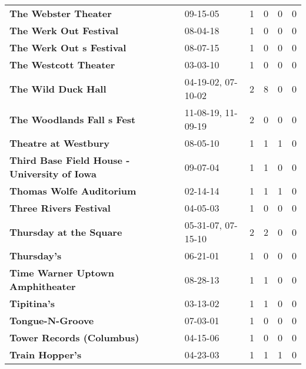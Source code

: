 \begin{supertabular}{p{0.4\textwidth}p{0.3\textwidth}p{0.05\textwidth}p{0.05\textwidth}p{0.05\textwidth}p{0.05\textwidth}}
                                         \textbf{The Webster Theater} &            09-15-05 &  1 &  0 &  0 &  0 \\
                                       \textbf{The Werk Out Festival} &            08-04-18 &  1 &  0 &  0 &  0 \\
                                     \textbf{The Werk Out s Festival} &            08-07-15 &  1 &  0 &  0 &  0 \\
                                        \textbf{The Westcott Theater} &            03-03-10 &  1 &  0 &  0 &  0 \\
                                          \textbf{The Wild Duck Hall} &  04-19-02, 07-10-02 &  2 &  8 &  0 &  0 \\
                                   \textbf{The Woodlands Fall s Fest} &  11-08-19, 11-09-19 &  2 &  0 &  0 &  0 \\
                                         \textbf{Theatre at Westbury} &            08-05-10 &  1 &  1 &  1 &  0 \\
                 \textbf{Third Base Field House - University of Iowa} &            09-07-04 &  1 &  1 &  0 &  0 \\
                                     \textbf{Thomas Wolfe Auditorium} &            02-14-14 &  1 &  1 &  1 &  0 \\
                                       \textbf{Three Rivers Festival} &            04-05-03 &  1 &  0 &  0 &  0 \\
                                      \textbf{Thursday at the Square} &  05-31-07, 07-15-10 &  2 &  2 &  0 &  0 \\
                                                  \textbf{Thursday's} &            06-21-01 &  1 &  0 &  0 &  0 \\
                             \textbf{Time Warner Uptown Amphitheater} &            08-28-13 &  1 &  1 &  0 &  0 \\
                                                  \textbf{Tipitina's} &            03-13-02 &  1 &  1 &  0 &  0 \\
                                             \textbf{Tongue-N-Groove} &            07-03-01 &  1 &  0 &  0 &  0 \\
                                    \textbf{Tower Records (Columbus)} &            04-15-06 &  1 &  0 &  0 &  0 \\
                                              \textbf{Train Hopper's} &            04-23-03 &  1 &  1 &  1 &  0 \\

\end{supertabular}
